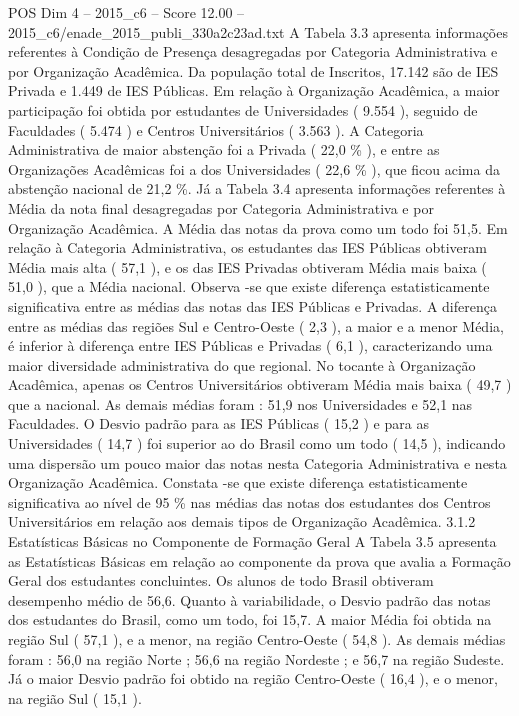 \begin{textsample}{POS Dim 4 – 2015\_c6 – Score 12.00 – 2015\_c6/enade\_2015\_publi\_330a2c23ad.txt}
A Tabela 3.3 apresenta informações referentes à Condição de Presença desagregadas por Categoria Administrativa e por Organização Acadêmica.
Da população total de Inscritos, 17.142 são de IES Privada e 1.449 de IES Públicas.
Em relação à Organização Acadêmica, a maior participação foi obtida por estudantes de Universidades ( 9.554 ), seguido de Faculdades ( 5.474 ) e Centros Universitários ( 3.563 ).
A Categoria Administrativa de maior abstenção foi a Privada ( 22,0 \% ), e entre as Organizações Acadêmicas foi a dos Universidades ( 22,6 \% ), que ficou acima da abstenção nacional de 21,2 \%.
Já a Tabela 3.4 apresenta informações referentes à Média da nota final desagregadas por Categoria Administrativa e por Organização Acadêmica.
A Média das notas da prova como um todo foi 51,5.
Em relação à Categoria Administrativa, os estudantes das IES Públicas obtiveram Média mais alta ( 57,1 ), e os das IES Privadas obtiveram Média mais baixa ( 51,0 ), que a Média nacional.
Observa -se que existe diferença estatisticamente significativa entre as médias das notas das IES Públicas e Privadas.
A diferença entre as médias das regiões Sul e Centro-Oeste ( 2,3 ), a maior e a menor Média, é inferior à diferença entre IES Públicas e Privadas ( 6,1 ), caracterizando uma maior diversidade administrativa do que regional.
No tocante à Organização Acadêmica, apenas os Centros Universitários obtiveram Média mais baixa ( 49,7 ) que a nacional.
As demais médias foram : 51,9 nos Universidades e 52,1 nas Faculdades.
O Desvio padrão para as IES Públicas ( 15,2 ) e para as Universidades ( 14,7 ) foi superior ao do Brasil como um todo ( 14,5 ), indicando uma dispersão um pouco maior das notas nesta Categoria Administrativa e nesta Organização Acadêmica.
Constata -se que existe diferença estatisticamente significativa ao nível de 95 \% nas médias das notas dos estudantes dos Centros Universitários em relação aos demais tipos de Organização Acadêmica. 3.1.2 Estatísticas Básicas no Componente de Formação Geral A Tabela 3.5 apresenta as Estatísticas Básicas em relação ao componente da prova que avalia a Formação Geral dos estudantes concluintes.
Os alunos de todo Brasil obtiveram desempenho médio de 56,6.
Quanto à variabilidade, o Desvio padrão das notas dos estudantes do Brasil, como um todo, foi 15,7.
A maior Média foi obtida na região Sul ( 57,1 ), e a menor, na região Centro-Oeste ( 54,8 ).
As demais médias foram : 56,0 na região Norte ; 56,6 na região Nordeste ; e 56,7 na região Sudeste.
Já o maior Desvio padrão foi obtido na região Centro-Oeste ( 16,4 ), e o menor, na região Sul ( 15,1 ).

\end{textsample}
